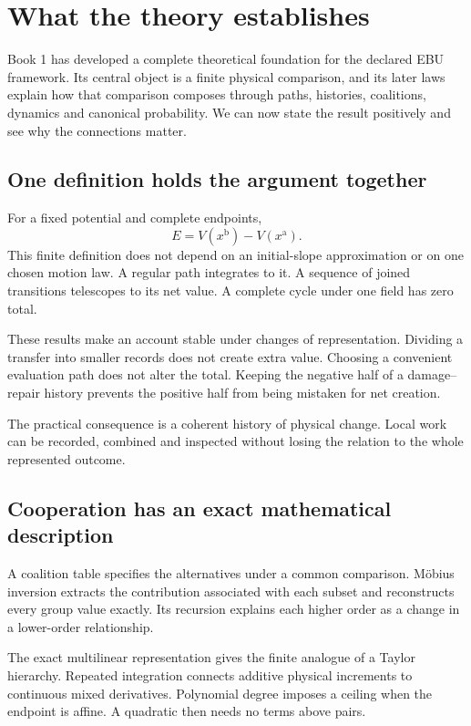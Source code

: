 \chapter{What the theory establishes}\label{ch:evidence}

Book 1 has developed a complete theoretical foundation for the declared EBU framework. Its central object is a finite physical comparison, and its later laws explain how that comparison composes through paths, histories, coalitions, dynamics and canonical probability. We can now state the result positively and see why the connections matter.

\section{One definition holds the argument together}
For a fixed potential and complete endpoints,
\begin{equation}
 E=V(x^{\mathrm b})-V(x^{\mathrm a}).
\end{equation}
This finite definition does not depend on an initial-slope approximation or on one chosen motion law. A regular path integrates to it. A sequence of joined transitions telescopes to its net value. A complete cycle under one field has zero total.

These results make an account stable under changes of representation. Dividing a transfer into smaller records does not create extra value. Choosing a convenient evaluation path does not alter the total. Keeping the negative half of a damage--repair history prevents the positive half from being mistaken for net creation.

The practical consequence is a coherent history of physical change. Local work can be recorded, combined and inspected without losing the relation to the whole represented outcome.

\section{Cooperation has an exact mathematical description}
A coalition table specifies the alternatives under a common comparison. Möbius inversion extracts the contribution associated with each subset and reconstructs every group value exactly. Its recursion explains each higher order as a change in a lower-order relationship.

The exact multilinear representation gives the finite analogue of a Taylor hierarchy. Repeated integration connects additive physical increments to continuous mixed derivatives. Polynomial degree imposes a ceiling when the endpoint is affine. A quadratic then needs no terms above pairs.

